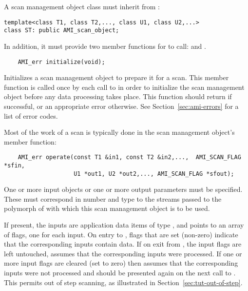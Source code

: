 A scan management object class must inherit from :
\begin{verbatim}
template<class T1, class T2,..., class U1, class U2,...>
class ST: public AMI_scan_object;
\end{verbatim}
In addition, it must provide two member
functions for  to call:  and .
\begin{verbatim}
    AMI_err initialize(void);
\end{verbatim}
    Initializes a scan management object to prepare
    it for a scan.  This member function is called once by
    each call to  in order to initialize
    the scan management object before any data processing
    takes place.  This function should return
     if successful, or an
    appropriate error otherwise. See
    Section~\ref{sec:ami-errors} for a list of error codes.
    
    Most of the work of a scan is typically done in the scan
    management object's  member function:
\begin{verbatim}
    AMI_err operate(const T1 &in1, const T2 &in2,...,  AMI_SCAN_FLAG *sfin,
                    U1 *out1, U2 *out2,..., AMI_SCAN_FLAG *sfout);
\end{verbatim}
    
    One or more input objects or one or more output
    parameters must be specified.  These must correspond in
    number and type to the streams passed to the polymorph
    of  with which this scan management
    object is to be used.
    
    If present, the inputs  are application
    data items of type , and  points
    to an array of flags, one for each input.  On entry to
    , flags that are set (non-zero)
    indicate that the corresponding inputs contain data.  If
    on exit from , the input flags are
    left untouched,  assumes that the
    corresponding inputs were processed.  If one or more
    input flags are cleared (set to zero) then
     assumes that the corresponding
    inputs were not processed and should be presented again
    on the next call to .  This permits
    out of step scanning, as
    illustrated in Section~\ref{sec:tut-out-of-step}.
    
